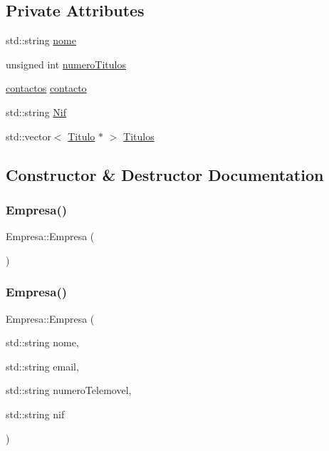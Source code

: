 \subsection*{Private Attributes}
\begin{DoxyCompactItemize}
\item 
std\+::string \mbox{\hyperlink{class_empresa_affa32f93b722be794531dbfb26cb19b3}{nome}}
\item 
unsigned int \mbox{\hyperlink{class_empresa_a375bf18365e4a52cc16ca5cdab7c8c5f}{numero\+Titulos}}
\item 
\mbox{\hyperlink{structcontactos}{contactos}} \mbox{\hyperlink{class_empresa_ad6e0d3239991fec739d8af4fda632fb9}{contacto}}
\item 
std\+::string \mbox{\hyperlink{class_empresa_aac18efdd86c506c27a191fb0569b7b23}{Nif}}
\item 
std\+::vector$<$ \mbox{\hyperlink{class_titulo}{Titulo}} $\ast$ $>$ \mbox{\hyperlink{class_empresa_a02a71346cff2f286d265ed75e78bef36}{Titulos}}
\end{DoxyCompactItemize}


\subsection{Constructor \& Destructor Documentation}
\mbox{\label{class_empresa_aff124b958356c479ab50ddf4cf302193}} 
\subsubsection{\texorpdfstring{Empresa()}{Empresa()}\hspace{0.1cm}{\footnotesize\ttfamily [1/2]}}
{\footnotesize\ttfamily Empresa\+::\+Empresa (\begin{DoxyParamCaption}{ }\end{DoxyParamCaption})\hspace{0.3cm}{\ttfamily [inline]}}

\mbox{\label{class_empresa_a19748f9e5c99292e3cd1489712751271}} 
\subsubsection{\texorpdfstring{Empresa()}{Empresa()}\hspace{0.1cm}{\footnotesize\ttfamily [2/2]}}
{\footnotesize\ttfamily Empresa\+::\+Empresa (\begin{DoxyParamCaption}\item[{std\+::string}]{nome,  }\item[{std\+::string}]{email,  }\item[{std\+::string}]{numero\+Telemovel,  }\item[{std\+::string}]{nif }\end{DoxyParamCaption})}



